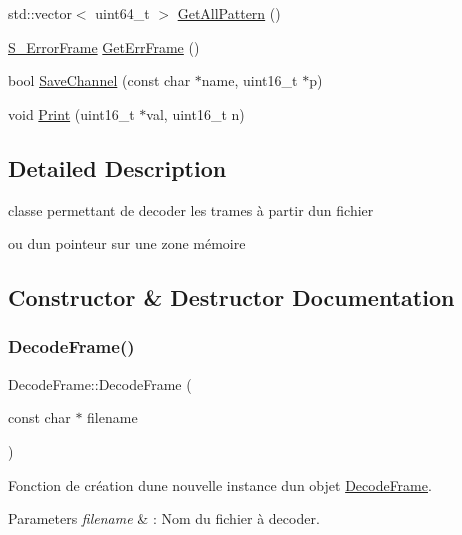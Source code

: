 \begin{DoxyCompactItemize}
\item 
std\+::vector$<$ uint64\+\_\+t $>$ \hyperlink{classDecodeFrame_a86005f4e7d6746978adc98b07e444d1c}{Get\+All\+Pattern} ()
\item 
\hyperlink{structS__ErrorFrame}{S\+\_\+\+Error\+Frame} \hyperlink{classDecodeFrame_af2f7c0e88138db96e36d866d1845fa03}{Get\+Err\+Frame} ()
\item 
bool \hyperlink{classDecodeFrame_a8bf6c842a468a6b43ff3c6bc8b184924}{Save\+Channel} (const char $\ast$name, uint16\+\_\+t $\ast$p)
\item 
void \hyperlink{classDecodeFrame_a83d99fa14a97a0a0d7649afe63a44696}{Print} (uint16\+\_\+t $\ast$val, uint16\+\_\+t n)
\end{DoxyCompactItemize}


\subsection{Detailed Description}
classe permettant de decoder les trames à partir d\textquotesingle{}un fichier 

ou d\textquotesingle{}un pointeur sur une zone mémoire 

\subsection{Constructor \& Destructor Documentation}
\mbox{\label{classDecodeFrame_ad55f7834381bfcdbe5796d11febfe3f0}} 
\subsubsection{\texorpdfstring{Decode\+Frame()}{DecodeFrame()}\hspace{0.1cm}{\footnotesize\ttfamily [1/2]}}
{\footnotesize\ttfamily Decode\+Frame\+::\+Decode\+Frame (\begin{DoxyParamCaption}\item[{const char $\ast$}]{filename }\end{DoxyParamCaption})}



Fonction de création d\textquotesingle{}une nouvelle instance d\textquotesingle{}un objet \hyperlink{classDecodeFrame}{Decode\+Frame}. 


\begin{DoxyParams}{Parameters}
{\em filename} & \+: Nom du fichier à decoder. \\
\hline
\end{DoxyParams}
\mbox{\label{classDecodeFrame_ae6ae88ee29bcaff936e7c7b2380f96b4}} 
